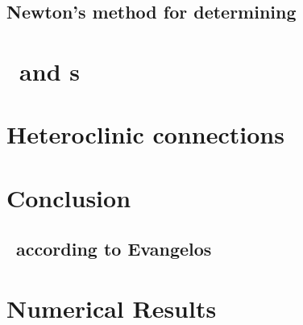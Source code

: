 \documentclass[hyperref]{inputs/gatech-thesis}
\begin{document}
    \section{Newton's method for determining \reqva}
        


\chapter{\Eqva\ and \po s}

\chapter{Heteroclinic connections}

\chapter{Conclusion}



\appendix

\section{\KSe\ according to Evangelos}


\chapter{Numerical Results}

         \PublicPrivate{
         }{ %
 
         } %
\begin{postliminary}
{}
\begin{vita}
    
\end{vita}
\end{postliminary}
\end{document}
